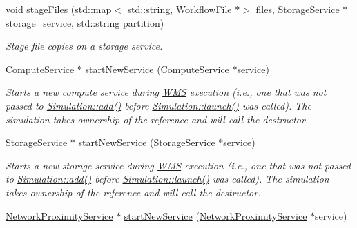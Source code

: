 \begin{DoxyCompactItemize}
void \hyperlink{classwrench_1_1_simulation_a9f2ef12def38561c2fcd9f96d2d019aa}{stage\+Files} (std\+::map$<$ std\+::string, \hyperlink{classwrench_1_1_workflow_file}{Workflow\+File} $\ast$$>$ files, \hyperlink{classwrench_1_1_storage_service}{Storage\+Service} $\ast$storage\+\_\+service, std\+::string partition)
\begin{DoxyCompactList}\small\item\em Stage file copies on a storage service. \end{DoxyCompactList}\item 
\hyperlink{classwrench_1_1_compute_service}{Compute\+Service} $\ast$ \hyperlink{classwrench_1_1_simulation_ae2d8cb3f49d7c7cd7f8ee1c6f02d8069}{start\+New\+Service} (\hyperlink{classwrench_1_1_compute_service}{Compute\+Service} $\ast$service)
\begin{DoxyCompactList}\small\item\em Starts a new compute service during \hyperlink{classwrench_1_1_w_m_s}{W\+MS} execution (i.\+e., one that was not passed to \hyperlink{classwrench_1_1_simulation_ad1f5c12285ecfaf5a2ce7dab5ec8b4c5}{Simulation\+::add()} before \hyperlink{classwrench_1_1_simulation_ae9589632de9a2311ed1d7f7747478985}{Simulation\+::launch()} was called). The simulation takes ownership of the reference and will call the destructor. \end{DoxyCompactList}\item 
\hyperlink{classwrench_1_1_storage_service}{Storage\+Service} $\ast$ \hyperlink{classwrench_1_1_simulation_a9e862e02395fec3e153c85e58332f3d4}{start\+New\+Service} (\hyperlink{classwrench_1_1_storage_service}{Storage\+Service} $\ast$service)
\begin{DoxyCompactList}\small\item\em Starts a new storage service during \hyperlink{classwrench_1_1_w_m_s}{W\+MS} execution (i.\+e., one that was not passed to \hyperlink{classwrench_1_1_simulation_ad1f5c12285ecfaf5a2ce7dab5ec8b4c5}{Simulation\+::add()} before \hyperlink{classwrench_1_1_simulation_ae9589632de9a2311ed1d7f7747478985}{Simulation\+::launch()} was called). The simulation takes ownership of the reference and will call the destructor. \end{DoxyCompactList}\item 
\hyperlink{classwrench_1_1_network_proximity_service}{Network\+Proximity\+Service} $\ast$ \hyperlink{classwrench_1_1_simulation_a7691eeb05b21e77d4a667b5931851001}{start\+New\+Service} (\hyperlink{classwrench_1_1_network_proximity_service}{Network\+Proximity\+Service} $\ast$service)
$$
\end{DoxyCompactItemize}
